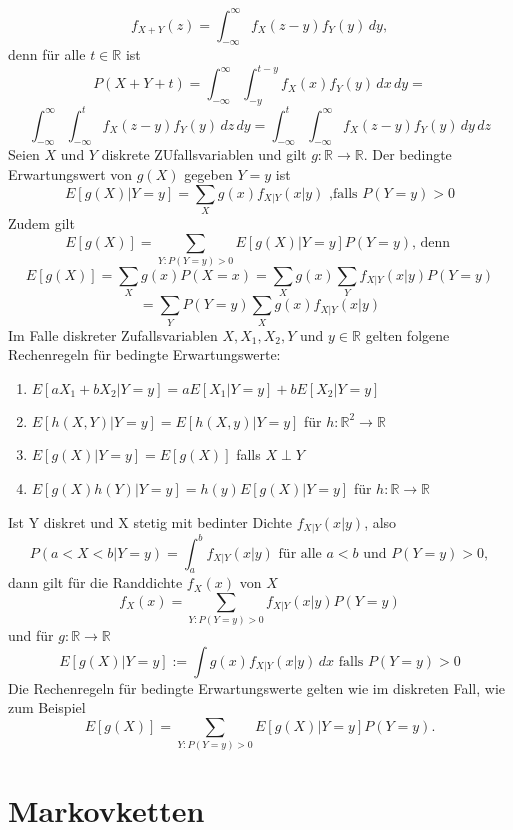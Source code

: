 \documentclass[a4paper,12pt]{article}
\begin{document}
$$
	f_{X+Y}(z) = \int_{-\infty}^{\infty} f_{X}(z-y)f_Y(y) \, dy,
$$
denn für alle $t \in \mathbb{R}$ ist
$$
	P(X+Y+t) = \int_{-\infty}^{\infty} \int_{-y}^{t-y}f_X(x)f_Y(y) \,dx \,dy =  $$ $$\int_{-\infty}^{\infty} \int_{-\infty}^{t}f_{X}(z-y)f_Y(y) \, dz \,dy = \int_{-\infty}^{t}\int_{-\infty}^{\infty}f_X(z-y)f_Y(y) \, dy \, dz
$$
Seien $X$ und $Y$ diskrete ZUfallsvariablen und gilt $g: \mathbb{R} \to \mathbb{R}$. Der bedingte Erwartungswert von $g(X)$ gegeben $Y=y$ ist
$$
	E[g(X)|Y=y] = \sum_{X}g(x)f_{X|Y}(x|y) \text{ ,falls } P(Y=y) > 0
$$
Zudem gilt
$$
	E[g(X)] = \sum_{Y:P(Y=y)>0}E[g(X)|Y=y]P(Y=y) \text{, denn }
$$
$$
	E[g(X)] = \sum_{X}g(x)P(X=x) = \sum_{X}g(x) \sum_{Y}f_{X|Y}(x|y)P(Y=y)
$$
$$
	= \sum_{Y}P(Y=y)\sum_{X}g(x)f_{X|Y}(x|y)
$$
Im Falle diskreter Zufallsvariablen $X, X_1, X_2, Y$ und $y \in \mathbb{R}$ gelten folgene Rechenregeln für bedingte Erwartungswerte:
\begin{enumerate}
	\item $E[aX_1 + bX_2 | Y=y] = aE[X_1 |Y=y] + b E[X_2 |Y=y]$
	\item $E[h(X,Y)|Y=y] = E[h(X,y) | Y=y          ]$ für $h: \mathbb{R}^2 \to \mathbb{R}$
	\item $E[g(X)| Y=y] = E[g(X)]$ falls $X \perp Y$
	\item $E[g(X)h(Y)|Y=y] = h(y)E[g(X)|Y=y]$ für $h: \mathbb{R} \to \mathbb{R}$
\end{enumerate}
Ist Y diskret und X stetig mit bedinter Dichte $f_{X|Y}(x|y)$, also
$$
	P(a < X < b | Y=y) = \int_{a}^{b}f_{X|Y}(x|y) \text{ für alle } a < b \text{ und } P(Y=y)>0
	,$$
dann gilt für die Randdichte $f_X(x)$ von $X$
$$
	f_X(x) = \sum_{Y:P(Y=y)>0}f_{X|Y}(x|y)P(Y=y)
$$
und für $g: \mathbb{R} \to \mathbb{R}$
$$
	E[g(X)|Y=y]:= \int g(x)f_{X|Y}(x|y) \, dx \text{ falls } P(Y=y) > 0
$$
Die Rechenregeln für bedingte Erwartungswerte gelten wie im diskreten Fall, wie zum Beispiel
$$
	E[g(X)] = \sum_{Y:P(Y=y)>0}E[g(X)|Y=y]P(Y=y)
	.$$

\section{Markovketten}
\end{document}
